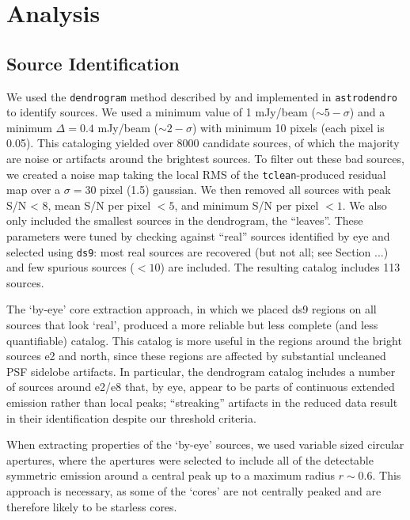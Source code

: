 \documentclass{aa}
\begin{document}
\section{Analysis}
\subsection{Source Identification}
We used the \texttt{dendrogram} method described by \citet{Rosolowsky2008c} and
implemented in \texttt{astrodendro} to identify sources.  We used a minimum
value of 1 mJy/beam ($\sim5-\sigma$) and a minimum $\Delta=0.4$ mJy/beam
($\sim2-\sigma$) with minimum 10 pixels (each pixel is 0.05\arcsec).  This
cataloging yielded over 8000 candidate sources, of which the majority are noise
or artifacts around the brightest sources.  To filter out these bad sources,
we created a noise map taking the local RMS of the \texttt{tclean}-produced
residual map over a $\sigma=30$ pixel (1.5\arcsec) gaussian.  We then removed
all sources with peak S/N < 8, mean S/N per pixel $< 5$, and minimum S/N per
pixel $ < 1$.  We also only included the smallest sources in the dendrogram,
the ``leaves''.  These parameters were tuned by checking against ``real''
sources identified by eye and selected using \texttt{ds9}: most real sources are
recovered (but not all; see Section ...) and few spurious sources ($<10$) are
included.  The resulting catalog includes 113 sources.

The `by-eye' core extraction approach, in which we placed ds9 regions on all
sources that look `real', produced a more reliable but less complete (and less
quantifiable) catalog.  This catalog is more useful in the regions around the
bright sources e2 and north, since these regions are affected by substantial
uncleaned PSF sidelobe artifacts.  In particular, the dendrogram catalog includes
a number of sources around e2/e8 that, by eye, appear to be parts of continuous
extended emission rather than local peaks; ``streaking'' artifacts in the
reduced data result in their identification despite our threshold criteria.

When extracting properties of the `by-eye' sources, we used variable sized
circular apertures, where the apertures were selected to include all of the
detectable symmetric emission around a central peak up to a maximum radius
$r\sim0.6$\arcsec.  This approach is necessary, as some of the `cores' are
not centrally peaked and are therefore likely to be starless cores.
\end{document}
